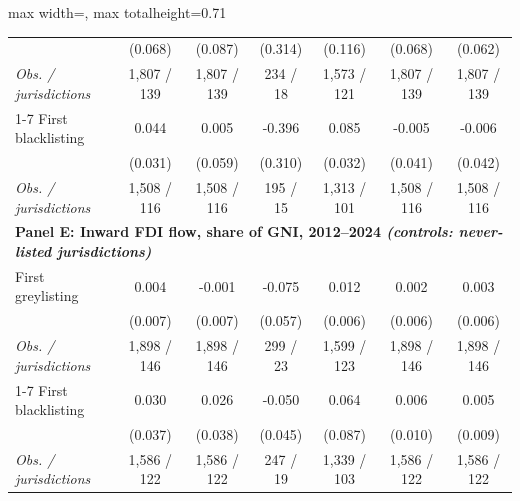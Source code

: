\begin{table}[p]
{\begin{adjustbox}{max width=\textwidth, max totalheight=0.71\textheight}
\begin{tabular}{l*{6}{c}}
 & (0.068) & (0.087) & (0.314) & (0.116) & (0.068) & (0.062) \\
\hspace{1em}\textit{Obs. / jurisdictions} & 1,807 / 139 & 1,807 / 139 & 234 / 18 & 1,573 / 121 & 1,807 / 139 & 1,807 / 139 \\
\cmidrule(lr){1-7}
First blacklisting & 0.044 & 0.005 & -0.396 & 0.085\sym{***} & -0.005 & -0.006 \\
 & (0.031) & (0.059) & (0.310) & (0.032) & (0.041) & (0.042) \\
\hspace{1em}\textit{Obs. / jurisdictions} & 1,508 / 116 & 1,508 / 116 & 195 / 15 & 1,313 / 101 & 1,508 / 116 & 1,508 / 116 \\
\midrule
\multicolumn{7}{l}{\textbf{Panel E: Inward FDI flow, share of GNI, 2012--2024 \normalfont\emph{(controls: never-listed jurisdictions)}}} \\[2pt]
First greylisting & 0.004 & -0.001 & -0.075 & 0.012\sym{**} & 0.002 & 0.003 \\
 & (0.007) & (0.007) & (0.057) & (0.006) & (0.006) & (0.006) \\
\hspace{1em}\textit{Obs. / jurisdictions} & 1,898 / 146 & 1,898 / 146 & 299 / 23 & 1,599 / 123 & 1,898 / 146 & 1,898 / 146 \\
\cmidrule(lr){1-7}
First blacklisting & 0.030 & 0.026 & -0.050 & 0.064 & 0.006 & 0.005 \\
 & (0.037) & (0.038) & (0.045) & (0.087) & (0.010) & (0.009) \\
\hspace{1em}\textit{Obs. / jurisdictions} & 1,586 / 122 & 1,586 / 122 & 247 / 19 & 1,339 / 103 & 1,586 / 122 & 1,586 / 122 \\
\bottomrule
\end{tabular}
\end{adjustbox}}
\begin{flushleft}\scriptsize

\end{flushleft}
\end{table}
